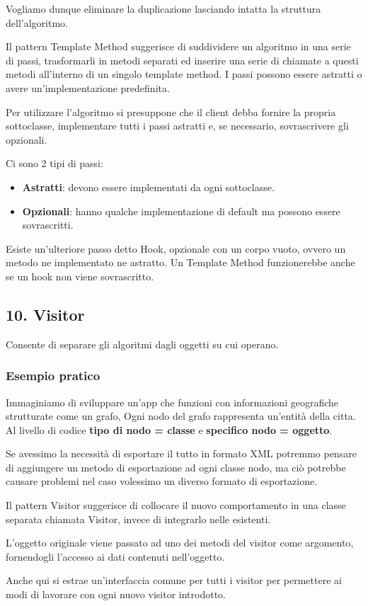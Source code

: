 \documentclass{report}
\begin{document}
\noindent
Vogliamo dunque eliminare la duplicazione lasciando intatta la struttura dell'algoritmo.

\medskip
\noindent
Il pattern Template Method suggerisce di suddividere un algoritmo in una serie di passi, trasformarli in metodi separati ed inserire una serie di chiamate a questi metodi all'interno di un singolo template method. I passi possono essere astratti o avere un'implementazione predefinita.

\noindent
Per utilizzare l'algoritmo si presuppone che il client debba fornire la propria sottoclasse, implementare tutti i passi astratti e, se necessario, sovrascrivere gli opzionali.

\medskip
\noindent
Ci sono 2 tipi di passi:
\begin{itemize}
    \item \textbf{Astratti}: devono essere implementati da ogni sottoclasse.
    \item \textbf{Opzionali}: hanno qualche implementazione di default ma possono essere sovrascritti.
\end{itemize}

\noindent
Esiste un'ulteriore passo detto Hook, opzionale con un corpo vuoto, ovvero un metodo ne implementato ne astratto. Un Template Method funzionerebbe anche se un hook non viene sovrascritto.

\subsection*{10. Visitor}
Consente di separare gli algoritmi dagli oggetti su cui operano.

\subsubsection*{Esempio pratico}
Immaginiamo di sviluppare un'app che funzioni con informazioni geografiche strutturate come un grafo, Ogni nodo del grafo rappresenta un'entità della citta. Al livello di codice \textbf{tipo di nodo = classe} e \textbf{specifico nodo = oggetto}.

\noindent
Se avessimo la necessità di esportare il tutto in formato XML potremmo pensare di aggiungere un metodo di esportazione ad ogni classe nodo, ma ciò potrebbe causare problemi nel caso volessimo un diverso formato di esportazione.

\medskip
\noindent
Il pattern Visitor suggerisce di collocare il nuovo comportamento in una classe separata chiamata Visitor, invece di integrarlo nelle esistenti.

\noindent
L'oggetto originale viene passato ad uno dei metodi del visitor come argomento, fornendogli l'accesso ai dati contenuti nell'oggetto.

\noindent
Anche qui si estrae un'interfaccia comune per tutti i visitor per permettere ai modi di lavorare con ogni nuovo visitor introdotto.






 
\end{document}
